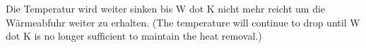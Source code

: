Die Temperatur wird weiter sinken bis W dot K nicht mehr reicht um die Wärmeabfuhr weiter zu erhalten.  
(The temperature will continue to drop until W dot K is no longer sufficient to maintain the heat removal.)